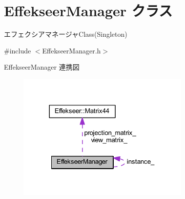 \hypertarget{class_effekseer_manager}{}\section{Effekseer\+Manager クラス}
\label{class_effekseer_manager}


エフェクシアマネージャ\+Class(\+Singleton)  




{\ttfamily \#include $<$Effekseer\+Manager.\+h$>$}



Effekseer\+Manager 連携図\nopagebreak
\begin{figure}[H]
\begin{center}
\leavevmode
\includegraphics[width=242pt]{class_effekseer_manager__coll__graph}
\end{center}
\end{figure}
